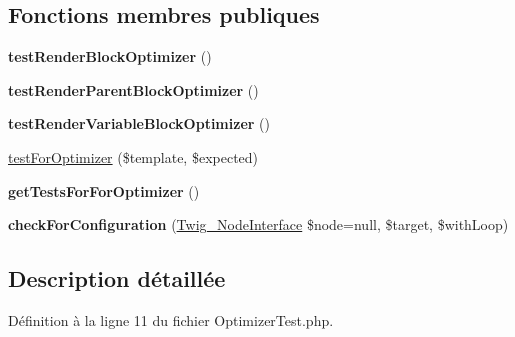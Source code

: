\subsection*{Fonctions membres publiques}
\begin{DoxyCompactItemize}
\item 
{\bfseries test\+Render\+Block\+Optimizer} ()\hypertarget{class_twig___tests___node_visitor___optimizer_test_a49514f2cbed3f9a02f310966ee658b84}{}\label{class_twig___tests___node_visitor___optimizer_test_a49514f2cbed3f9a02f310966ee658b84}

\item 
{\bfseries test\+Render\+Parent\+Block\+Optimizer} ()\hypertarget{class_twig___tests___node_visitor___optimizer_test_a7247ef3c268162fb5f2d37b11f30d403}{}\label{class_twig___tests___node_visitor___optimizer_test_a7247ef3c268162fb5f2d37b11f30d403}

\item 
{\bfseries test\+Render\+Variable\+Block\+Optimizer} ()\hypertarget{class_twig___tests___node_visitor___optimizer_test_aa2ba89c27a70e82f3a1685e1aabfd774}{}\label{class_twig___tests___node_visitor___optimizer_test_aa2ba89c27a70e82f3a1685e1aabfd774}

\item 
\hyperlink{class_twig___tests___node_visitor___optimizer_test_a75d52f40aefe10c36b62a0db711b8ea2}{test\+For\+Optimizer} (\$template, \$expected)
\item 
{\bfseries get\+Tests\+For\+For\+Optimizer} ()\hypertarget{class_twig___tests___node_visitor___optimizer_test_adaca8f2b0e96970e31614f6a77360703}{}\label{class_twig___tests___node_visitor___optimizer_test_adaca8f2b0e96970e31614f6a77360703}

\item 
{\bfseries check\+For\+Configuration} (\hyperlink{interface_twig___node_interface}{Twig\+\_\+\+Node\+Interface} \$node=null, \$target, \$with\+Loop)\hypertarget{class_twig___tests___node_visitor___optimizer_test_aba7bb02f5a5284f847391a6c9e71a6a5}{}\label{class_twig___tests___node_visitor___optimizer_test_aba7bb02f5a5284f847391a6c9e71a6a5}

\end{DoxyCompactItemize}


\subsection{Description détaillée}


Définition à la ligne 11 du fichier Optimizer\+Test.\+php.



